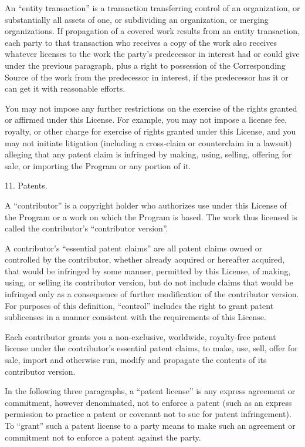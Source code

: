   An ``entity transaction'' is a transaction transferring control of an
organization, or substantially all assets of one, or subdividing an
organization, or merging organizations.  If propagation of a covered
work results from an entity transaction, each party to that
transaction who receives a copy of the work also receives whatever
licenses to the work the party's predecessor in interest had or could
give under the previous paragraph, plus a right to possession of the
Corresponding Source of the work from the predecessor in interest, if
the predecessor has it or can get it with reasonable efforts.

  You may not impose any further restrictions on the exercise of the
rights granted or affirmed under this License.  For example, you may
not impose a license fee, royalty, or other charge for exercise of
rights granted under this License, and you may not initiate litigation
(including a cross-claim or counterclaim in a lawsuit) alleging that
any patent claim is infringed by making, using, selling, offering for
sale, or importing the Program or any portion of it.

  11. Patents.

  A ``contributor'' is a copyright holder who authorizes use under this
License of the Program or a work on which the Program is based.  The
work thus licensed is called the contributor's ``contributor version''.

  A contributor's ``essential patent claims'' are all patent claims
owned or controlled by the contributor, whether already acquired or
hereafter acquired, that would be infringed by some manner, permitted
by this License, of making, using, or selling its contributor version,
but do not include claims that would be infringed only as a
consequence of further modification of the contributor version.  For
purposes of this definition, ``control'' includes the right to grant
patent sublicenses in a manner consistent with the requirements of
this License.

  Each contributor grants you a non-exclusive, worldwide, royalty-free
patent license under the contributor's essential patent claims, to
make, use, sell, offer for sale, import and otherwise run, modify and
propagate the contents of its contributor version.

  In the following three paragraphs, a ``patent license'' is any express
agreement or commitment, however denominated, not to enforce a patent
(such as an express permission to practice a patent or covenant not to
sue for patent infringement).  To ``grant'' such a patent license to a
party means to make such an agreement or commitment not to enforce a
patent against the party.

